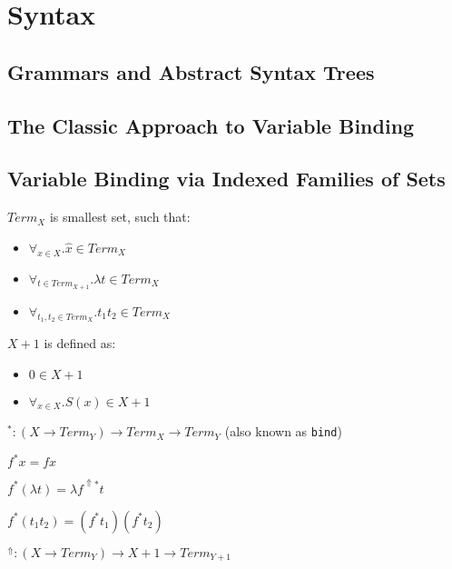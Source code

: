\chapter{Syntax}

\section{Grammars and Abstract Syntax Trees}

\section{The Classic Approach to Variable Binding}

\section{Variable Binding via Indexed Families of Sets}

$Term_{X}$ is smallest set, such that:

\begin{itemize}
  \item $\forall_{x \in X}. \widehat{x} \in Term_{X}$
  \item $\forall_{t \in Term_{X+1}}. \lambda t \in Term_X$
  \item $\forall_{t_1, t_2 \in Term_X}. t_1 t_2 \in Term_X$
\end{itemize}

$X+1$ is defined as:

\begin{itemize}
  \item $0 \in X+1$
  \item $\forall_{x \in X}. S(x) \in X+1$
\end{itemize}

$^* : (X \rightarrow Term_Y) \rightarrow Term_X \rightarrow Term_Y$ (also known as \texttt{bind})

$f^*x = f x $

$f^*(\lambda t) = \lambda f^{\Uparrow*} t $

$f^*(t_1 t_2) = (f^* t_1) (f^* t_2)$

\medskip

$^\Uparrow : (X \rightarrow Term_Y) \rightarrow X+1 \rightarrow Term_{Y+1}$

